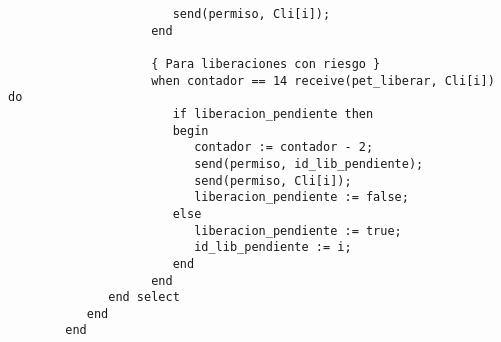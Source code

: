 \begin{ejercicio}
\begin{verbatim}
                       send(permiso, Cli[i]);
                    end

                    { Para liberaciones con riesgo }
                    when contador == 14 receive(pet_liberar, Cli[i]) do
                       if liberacion_pendiente then
                       begin
                          contador := contador - 2;
                          send(permiso, id_lib_pendiente);
                          send(permiso, Cli[i]);
                          liberacion_pendiente := false;
                       else
                          liberacion_pendiente := true;
                          id_lib_pendiente := i;
                       end
                    end
              end select
           end
        end
    \end{verbatim}
\end{ejercicio}


